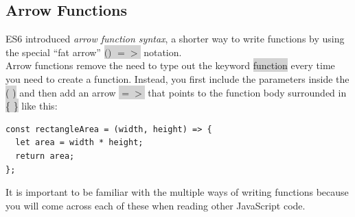 \documentclass[11pt]{article}
\begin{document}
\subsection{Arrow Functions}
ES6 introduced \textit{arrow function syntax}, a shorter way to write functions by using the special “fat arrow” \colorbox{lightgray}{$($$)$ $=$$>$} notation. \\
\newline
Arrow functions remove the need to type out the keyword \colorbox{lightgray}{function} every time you need to create a function. Instead, you first include the parameters inside the \colorbox{lightgray}{( )} and then add an arrow \colorbox{lightgray}{$=$$>$} that points to the function body surrounded in \colorbox{lightgray}{\{ \}} like this:
\begin{lstlisting}
const rectangleArea = (width, height) => {
  let area = width * height;
  return area;
};
\end{lstlisting}
It is important to be familiar with the multiple ways of writing functions because you will come across each of these when reading other JavaScript code.
\end{document}
